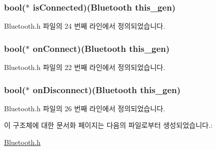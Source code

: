 \hypertarget{struct___bluetooth_afaf7348f13265482f31f6bb326de23d3}{
\subsubsection[{is\-Connected}]{\setlength{\rightskip}{0pt plus 5cm}bool($\ast$  is\-Connected)({\bf Bluetooth} this\-\_\-gen)}}\label{struct___bluetooth_afaf7348f13265482f31f6bb326de23d3}


Bluetooth.\-h 파일의 24 번째 라인에서 정의되었습니다.

\hypertarget{struct___bluetooth_a02ed8ce853ef7914c2d0663ddc85bf71}{
\subsubsection[{on\-Connect}]{\setlength{\rightskip}{0pt plus 5cm}bool($\ast$  on\-Connect)({\bf Bluetooth} this\-\_\-gen)}}\label{struct___bluetooth_a02ed8ce853ef7914c2d0663ddc85bf71}


Bluetooth.\-h 파일의 22 번째 라인에서 정의되었습니다.

\hypertarget{struct___bluetooth_a73fc8eb303afc5b6d5e9188e623f8d3d}{
\subsubsection[{on\-Disconnect}]{\setlength{\rightskip}{0pt plus 5cm}bool($\ast$  on\-Disconnect)({\bf Bluetooth} this\-\_\-gen)}}\label{struct___bluetooth_a73fc8eb303afc5b6d5e9188e623f8d3d}


Bluetooth.\-h 파일의 26 번째 라인에서 정의되었습니다.



이 구조체에 대한 문서화 페이지는 다음의 파일로부터 생성되었습니다.\-:\begin{DoxyCompactItemize}
\item 
\hyperlink{_bluetooth_8h}{Bluetooth.\-h}\end{DoxyCompactItemize}
